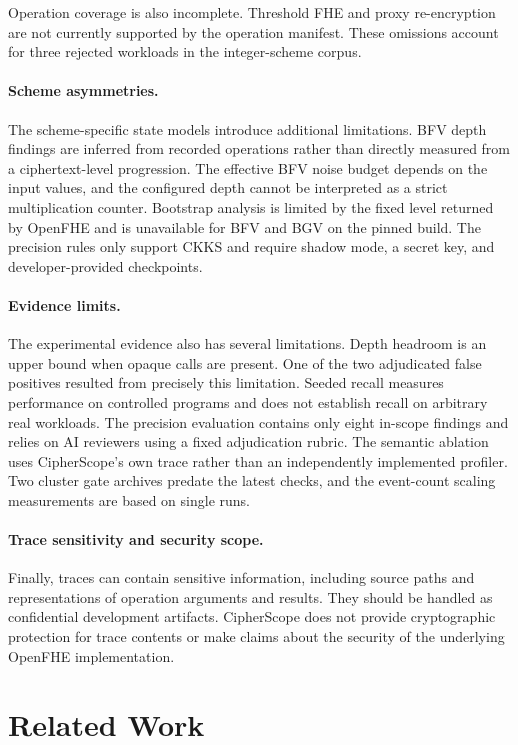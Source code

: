 \documentclass[sigconf,nonacm]{acmart}
\begin{document}
Operation coverage is also incomplete. Threshold FHE and proxy re-encryption
are not currently supported by the operation manifest. These omissions
account for three rejected workloads in the integer-scheme corpus.

\paragraph{Scheme asymmetries.} The scheme-specific state models introduce
additional limitations. BFV depth findings are inferred from recorded
operations rather than directly measured from a ciphertext-level progression.
The effective BFV noise budget depends on the input values, and the
configured depth cannot be interpreted as a strict multiplication counter.
Bootstrap analysis is limited by the fixed level returned by OpenFHE and is
unavailable for BFV and BGV on the pinned build. The precision rules only
support CKKS and require shadow mode, a secret key, and developer-provided
checkpoints.

\paragraph{Evidence limits.} The experimental evidence also has several
limitations. Depth headroom is an upper bound when opaque calls are present.
One of the two adjudicated false positives resulted from precisely this
limitation. Seeded recall measures performance on controlled programs and
does not establish recall on arbitrary real workloads. The precision
evaluation contains only eight in-scope findings and relies on AI reviewers
using a fixed adjudication rubric. The semantic ablation uses CipherScope's
own trace rather than an independently implemented profiler. Two cluster gate
archives predate the latest checks, and the event-count scaling measurements
are based on single runs.

\paragraph{Trace sensitivity and security scope.} Finally, traces can contain
sensitive information, including source paths and representations of
operation arguments and results. They should be handled as confidential
development artifacts. CipherScope does not provide cryptographic protection
for trace contents or make claims about the security of the underlying
OpenFHE implementation.

\section{Related Work}
\label{sec:related}
\end{document}
